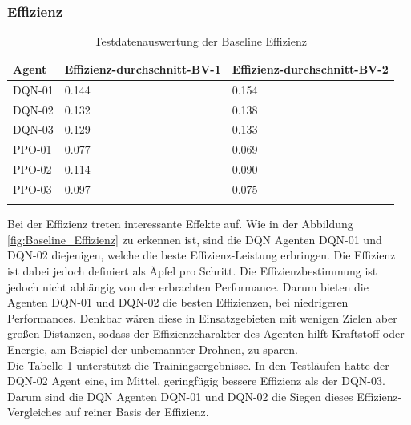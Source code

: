 \subsubsection{Effizienz}
\begin{longtable}[h]{|p{3.5cm}|p{3.0cm}|p{3.0cm}|}
	\hline
	Agent & Effizienz-durchschnitt-BV-1 & Effizienz-durchschnitt-BV-2  \\
	\hline
	DQN-01 & 0.144 & 0.154  \\
	\hline
	DQN-02 & 0.132 & 0.138  \\
	\hline
	DQN-03 & 0.129 & 0.133  \\
	\hline
	PPO-01 & 0.077 & 0.069 \\
	\hline
	PPO-02 & 0.114 & 0.090 \\
	\hline
	PPO-03 & 0.097 & 0.075 \\
	\hline
	\caption{Testdatenauswertung der Baseline Effizienz}
	\label{tab:Evaluation_Testdaten_Effizienz} 
\end{longtable}
Bei der Effizienz treten interessante Effekte auf. Wie in der Abbildung \ref{fig:Baseline_Effizienz} zu erkennen ist, sind die DQN Agenten DQN-01 und DQN-02 diejenigen, welche die beste Effizienz-Leistung erbringen. Die Effizienz ist dabei jedoch definiert als Äpfel pro Schritt. 
Die Effizienzbestimmung ist jedoch nicht abhängig von der erbrachten Performance. 
Darum bieten die Agenten DQN-01 und DQN-02 die besten Effizienzen, bei niedrigeren Performances. 
Denkbar wären diese in Einsatzgebieten mit wenigen Zielen aber großen Distanzen, sodass der Effizienzcharakter des Agenten hilft Kraftstoff oder Energie, am Beispiel der unbemannter Drohnen, zu sparen.\\
Die Tabelle \ref{tab:Evaluation_Testdaten_Effizienz} unterstützt die Trainingsergebnisse. In den Testläufen hatte der DQN-02 Agent eine, im Mittel, geringfügig bessere Effizienz als der DQN-03. Darum sind die DQN Agenten DQN-01 und DQN-02 die Siegen dieses Effizienz-Vergleiches auf reiner Basis der Effizienz.
